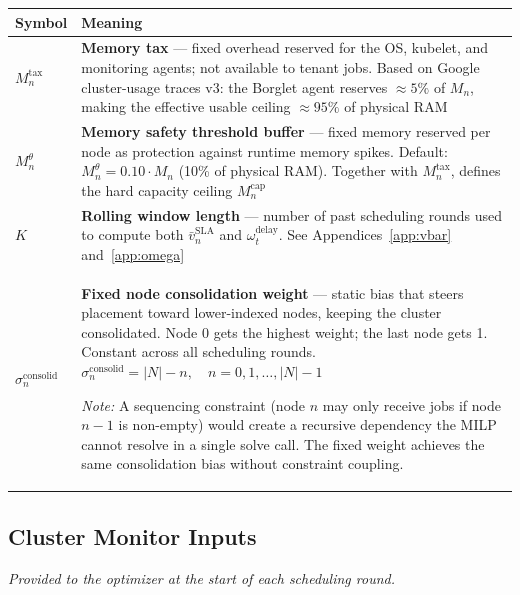 \documentclass[11pt]{article}
\newcommand{\vbarsla}{\bar{v}_n^{\text{SLA}}}
\newcommand{\Mcap}{M_n^{\text{cap}}}
\newcommand{\Mtax}{M_n^{\text{tax}}}
\newcommand{\Mtheta}{M_n^{\theta}}
\newcommand{\sigconsolid}{\sigma_n^{\text{consolid}}}
\newcommand{\omdelayt}{\omega_t^{\text{delay}}}
\begin{document}
\medskip
\begin{center}
\begin{tabular}{@{}l p{10.5cm}@{}}
\toprule
Symbol & Meaning \\
\midrule
$\Mtax$        & \textbf{Memory tax} --- fixed overhead reserved for the OS,
  kubelet, and monitoring agents; not available to tenant jobs.
  Based on Google cluster-usage traces v3: the Borglet agent reserves
  $\approx 5\%$ of $M_n$, making the effective usable ceiling $\approx 95\%$
  of physical RAM \\[6pt]
$\Mtheta$      & \textbf{Memory safety threshold buffer} --- fixed memory
  reserved per node as protection against runtime memory spikes.
  Default: $\Mtheta = 0.10 \cdot M_n$ (10\% of physical RAM).
  Together with $\Mtax$, defines the hard capacity ceiling $\Mcap$ \\[6pt]
$K$            & \textbf{Rolling window length} --- number of past scheduling
  rounds used to compute both $\vbarsla$ and $\omdelayt$.
  See Appendices~\ref{app:vbar} and~\ref{app:omega} \\[6pt]
$\sigconsolid$ & \textbf{Fixed node consolidation weight} --- static bias that
  steers placement toward lower-indexed nodes, keeping the cluster
  consolidated. Node 0 gets the highest weight; the last node gets 1.
  Constant across all scheduling rounds.
  $\sigconsolid = |N| - n,\quad n = 0, 1, \ldots, |N|-1$

  \smallskip\textit{Note:} A sequencing constraint (node $n$ may only receive
  jobs if node $n{-}1$ is non-empty) would create a recursive dependency the
  MILP cannot resolve in a single solve call. The fixed weight achieves the
  same consolidation bias without constraint coupling. \\
\bottomrule
\end{tabular}
\end{center}

\subsection*{Cluster Monitor Inputs}
\textit{Provided to the optimizer at the start of each scheduling round.}
\end{document}
